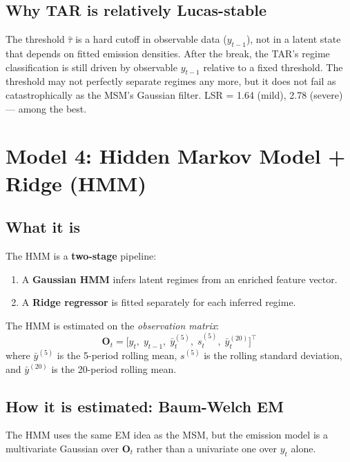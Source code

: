 \documentclass[11pt, a4paper]{article}
\begin{document}
\subsection{Why TAR is relatively Lucas-stable}

The threshold $\hat\tau$ is a hard cutoff in observable data ($y_{t-1}$), not
in a latent state that depends on fitted emission densities. After the break,
the TAR's regime classification is still driven by observable $y_{t-1}$
relative to a fixed threshold. The threshold may not perfectly separate
regimes any more, but it does not fail as catastrophically as the MSM's
Gaussian filter. LSR = 1.64 (mild), 2.78 (severe) --- among the best.

\section{Model 4: Hidden Markov Model + Ridge (HMM)}

\subsection{What it is}

The HMM is a \textbf{two-stage} pipeline:
\begin{enumerate}[leftmargin=*, itemsep=2pt]
  \item A \textbf{Gaussian HMM} infers latent regimes from an enriched
        feature vector.
  \item A \textbf{Ridge regressor} is fitted separately for each inferred regime.
\end{enumerate}

The HMM is estimated on the \emph{observation matrix}:
\[
  \mathbf{O}_t = \bigl[y_t,\;y_{t-1},\;\bar{y}^{(5)}_t,\;s^{(5)}_t,\;\bar{y}^{(20)}_t\bigr]^\top
\]
where $\bar{y}^{(5)}$ is the 5-period rolling mean, $s^{(5)}$ is the rolling
standard deviation, and $\bar{y}^{(20)}$ is the 20-period rolling mean.

\subsection{How it is estimated: Baum-Welch EM}

The HMM uses the same EM idea as the MSM, but the emission model is a
multivariate Gaussian over $\mathbf{O}_t$ rather than a univariate one over
$y_t$ alone.
\end{document}
